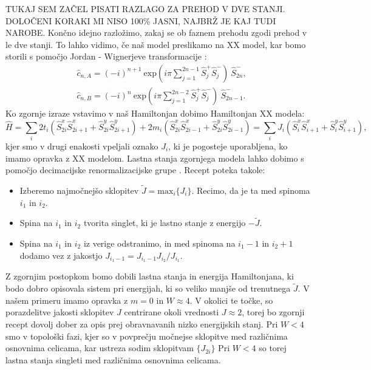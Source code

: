 TUKAJ SEM ZAČEL PISATI RAZLAGO ZA PREHOD V DVE STANJI. DOLOČENI KORAKI MI NISO 100\% JASNI, NAJBRŽ JE KAJ TUDI NAROBE.
Končno idejno razložimo, zakaj se ob faznem prehodu zgodi prehod v le dve stanji.
To lahko vidimo, če naš model preslikamo na XX model, kar bomo storili
s pomočjo Jordan - Wignerjeve transformacije \cite{mondragon}:
\begin{align}
&\hat{c}_{n,A} = (-i)^{n+1}\  \mathrm{exp}(i \pi \sum_{j=1}^{2n-1} \hat{S}_j^+ \hat{S}_j^-)\ \hat{S}_{2n}^-,\\
&\hat{c}_{n,B} = (-i)^n \ \mathrm{exp}(i \pi \sum_{j=1}^{2n-2} \hat{S}_j^+ \hat{S}_j^-) \ \hat{S}^-_{2n-1}.
\end{align}
Ko zgornje izraze vstavimo v naš Hamiltonjan dobimo Hamiltonjan XX modela:
\begin{equation}
\hat{H} = \sum_i 2 t_i ( \hat{S}^x_{2i} \hat{S}^x_{2i+1} + \hat{S}^y_{2i} \hat{S}^y_{2i+1}) + 2m_i (\hat{S}^x_{2i} \hat{S}^x_{2i-1} + \hat{S}^y_{2i} \hat{S}^y_{2i-1}) = \sum_i J_i (\hat{S}^x_i \hat{S}^x_{i+1} + \hat{S}^y_i \hat{S}^y_{i+1}),
\end{equation}
kjer smo v drugi enakosti vpeljali oznako $J_i$, ki je pogosteje uporabljena, ko imamo opravka z XX modelom. 
Lastna stanja zgornjega modela lahko dobimo s pomočjo decimacijske renormalizacijske grupe \cite{rg}.
Recept poteka takole:
\begin{itemize} 
\item Izberemo najmočnejšo sklopitev $\tilde{J} = \mathrm{max}_i \{ J_i \}$. Recimo, da je ta med spinoma $i_1$ in $i_2$.
\item Spina na $i_1$ in $i_2$ tvorita singlet, ki je lastno stanje z energijo $-\tilde{J}$. 
\item Spina na $i_1$ in $i_2$ iz verige odstranimo, in med spinoma na $i_1-1$ in $i_2+1$ dodamo vez z jakostjo $J_{i_1-1} = J_{i_1-1} J_{i_2} / J_{i_1}$.
\end{itemize}
Z zgornjim postopkom bomo dobili lastna stanja in energija Hamiltonjana, ki bodo dobro opisovala sistem pri energijah, ki so veliko manjše od trenutnega $\tilde{J}$. 
V našem primeru imamo opravka z $m=0$ in $W \approx 4$. V okolici te točke, so porazdelitve jakosti sklopitev $J$ centrirane okoli vrednosti $J \approx 2$, torej bo zgornji recept dovolj dober za opis prej obravnavanih nizko energijskih stanj.
Pri $W<4$ smo v topološki fazi, kjer so v povprečju močnejse sklopitve med različnima osnovnima celicama, kar ustreza sodim sklopitvam $\{ J_{2i} \}$ Pri $W<4$ so torej lastna stanja singleti med različnima osnovnima celicama.
